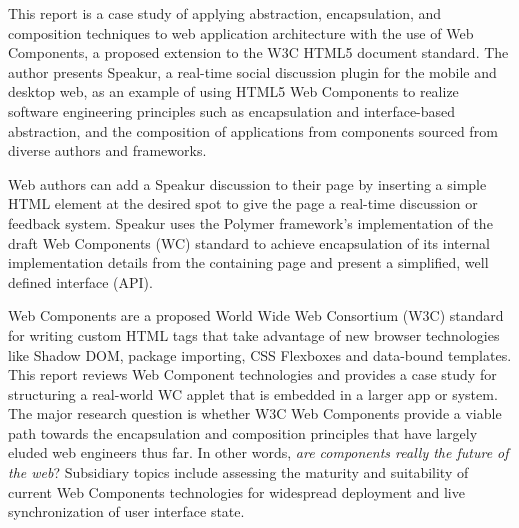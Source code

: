 \documentclass[12pt]{report}	%
\theoremstyle{definition}
\theoremstyle{remark}
\begin{document}
This report is a case study of applying abstraction, encapsulation, and composition techniques to web application architecture with the use of Web Components, 
a proposed extension to the W3C HTML5 document standard. 
The author presents Speakur, a real-time social discussion plugin for the mobile and desktop web, 
as an example of using HTML5 Web Components to realize software engineering principles such as encapsulation and interface-based abstraction, and the composition of applications from components sourced from diverse authors and frameworks.

Web authors can add a Speakur discussion to their page by inserting a simple HTML element at the desired spot to give the page a real-time discussion or feedback system.
Speakur uses the Polymer framework's implementation of the draft Web Components (WC) standard to achieve encapsulation of its internal implementation details from the containing page and present a simplified, well defined interface (API).

Web Components are a proposed World Wide Web Consortium (W3C) standard for writing custom HTML tags that take advantage of new browser technologies like Shadow DOM, package importing, CSS Flexboxes and data-bound templates.
This report reviews Web Component technologies and provides a case study for structuring a real-world WC applet that is embedded in a larger app or system.
The major research question is whether W3C Web Components provide a viable path towards the encapsulation and composition principles that have largely eluded web engineers thus far. 
In other words, \textit{are components really the future of the web}? 
Subsidiary topics include assessing the maturity and suitability of current Web Components technologies for widespread deployment and live synchronization of user interface state.


\tableofcontents   %

\listoftables      %
\listoffigures     %
\lstlistoflistings


%
%

\end{document}
